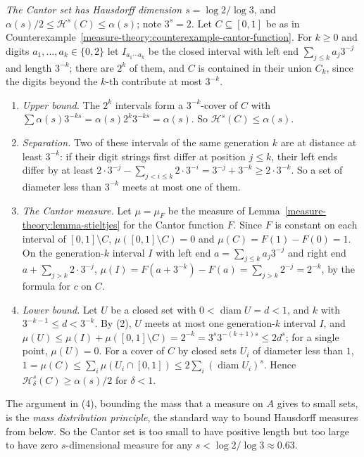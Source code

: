 \begin{example}\label{measure-theory:example-cantor-dimension}
\emph{The Cantor set has Hausdorff dimension $s = \log 2/\log 3$}, and $\alpha(s)/2 \leq \mathcal{H}^s(C) \leq \alpha(s)$; note $3^s = 2$. Let $C \subseteq [0, 1]$ be as in
Counterexample~\ref{measure-theory:counterexample-cantor-function}. For $k \geq 0$ and digits $a_1, \ldots, a_k \in \{0, 2\}$ let $I_{a_1\cdots a_k}$ be the closed interval with left end
$\sum_{j \leq k}a_j3^{-j}$ and length $3^{-k}$; there are $2^k$ of them, and $C$ is contained in their union $C_k$, since the digits beyond the $k$-th contribute at most $3^{-k}$.
\begin{enumerate}
\item \emph{Upper bound.} The $2^k$ intervals form a $3^{-k}$-cover of $C$ with $\sum\alpha(s)3^{-ks} = \alpha(s)2^k3^{-ks} = \alpha(s)$. So $\mathcal{H}^s(C) \leq \alpha(s)$.
\item \emph{Separation.} Two of these intervals of the same generation $k$ are at distance at least $3^{-k}$: if their digit strings first differ at position $j \leq k$, their left ends differ by
at least $2 \cdot 3^{-j} - \sum_{j < i \leq k}2 \cdot 3^{-i} = 3^{-j} + 3^{-k} \geq 2 \cdot 3^{-k}$. So a set of diameter less than $3^{-k}$ meets at most one of them.
\item \emph{The Cantor measure.} Let $\mu = \mu_F$ be the measure of Lemma~\ref{measure-theory:lemma-stieltjes} for the Cantor function $F$. Since $F$ is constant on each interval of
$[0, 1] \setminus C$, $\mu([0, 1] \setminus C) = 0$ and $\mu(C) = F(1) - F(0) = 1$. On the generation-$k$ interval $I$ with left end $a = \sum_{j \leq k}a_j3^{-j}$ and right end
$a + \sum_{j > k}2 \cdot 3^{-j}$, $\mu(I) = F(a + 3^{-k}) - F(a) = \sum_{j > k}2^{-j} = 2^{-k}$, by the formula for $c$ on $C$.
\item \emph{Lower bound.} Let $U$ be a closed set with $0 < \operatorname{diam}U = d < 1$, and $k$ with $3^{-k-1} \leq d < 3^{-k}$. By (2), $U$ meets at most one generation-$k$ interval $I$,
and $\mu(U) \leq \mu(I) + \mu([0, 1] \setminus C) = 2^{-k} = 3^s3^{-(k+1)s} \leq 2d^s$; for a single point, $\mu(U) = 0$. For a cover of $C$ by closed sets $U_i$ of diameter less than $1$,
$1 = \mu(C) \leq \sum_i\mu(U_i \cap [0, 1]) \leq 2\sum_i(\operatorname{diam}U_i)^s$. Hence $\mathcal{H}^s_\delta(C) \geq \alpha(s)/2$ for $\delta < 1$.
\end{enumerate}
The argument in (4), bounding the mass that a measure on $A$ gives to small sets, is the \emph{mass distribution principle}, the standard way to bound Hausdorff measures from below. So the Cantor
set is too small to have positive length but too large to have zero $s$-dimensional measure for any $s < \log 2/\log 3 \approx 0.63$.
\end{example}

